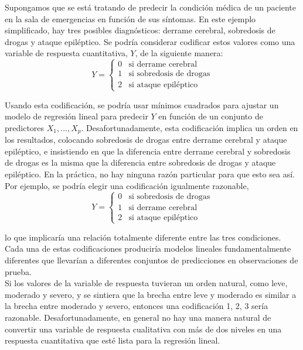 Supongamos que se está tratando de predecir la condición médica de un paciente en la sala de emergencias en función de sus síntomas. En este ejemplo simplificado, hay tres posibles diagnósticos: derrame cerebral, sobredosis de drogas y ataque epiléptico. Se podría considerar codificar estos valores como una variable de respuesta cuantitativa, $Y$, de la siguiente manera:
\begin{equation*}
Y = 
\begin{cases} 
0 & \text{si derrame cerebral} \\
1 & \text{si sobredosis de drogas} \\
2 & \text{si ataque epiléptico}
\end{cases}
\end{equation*}

Usando esta codificación, se podría usar mínimos cuadrados para ajustar un modelo de regresión lineal para predecir $Y$ en función de un conjunto de predictores $X_1,...,X_p$. Desafortunadamente, esta codificación implica un orden en los resultados, colocando sobredosis de drogas entre derrame cerebral y ataque epiléptico, e insistiendo en que la diferencia entre derrame cerebral y sobredosis de drogas es la misma que la diferencia entre sobredosis de drogas y ataque epiléptico. En la práctica, no hay ninguna razón particular para que esto sea así. Por ejemplo, se podría elegir una codificación igualmente razonable,
\begin{equation*}
Y = 
\begin{cases} 
0 & \text{si sobredosis de drogas} \\
1 & \text{si derrame cerebral} \\
2 & \text{si ataque epiléptico}
\end{cases}
\end{equation*}

\noindent lo que implicaría una relación totalmente diferente entre las tres condiciones. Cada una de estas codificaciones produciría modelos lineales fundamentalmente diferentes que llevarían a diferentes conjuntos de predicciones en observaciones de prueba. \\

Si los valores de la variable de respuesta tuvieran un orden natural, como leve, moderado y severo, y se sintiera que la brecha entre leve y moderado es similar a la brecha entre moderado y severo, entonces una codificación 1, 2, 3 sería razonable. Desafortunadamente, en general no hay una manera natural de convertir una variable de respuesta cualitativa con más de dos niveles en una respuesta cuantitativa que esté lista para la regresión lineal. \\

